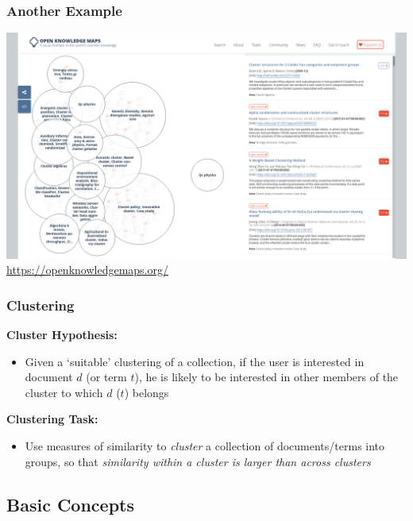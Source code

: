 \documentclass{beamer}
\begin{document}
\begin{frame}
  \frametitle{Another Example}

  \centering
  \includegraphics[width=\linewidth]{OKM}\\
  \footnotesize\url{https://openknowledgemaps.org/}

\end{frame}


\begin{frame}
  \frametitle{Clustering}

  \textbf{Cluster Hypothesis:}
  \begin{itemize}
  \item Given a `suitable' clustering of a collection, if the user is
    interested in document $d$ (or term $t$), he is likely to be interested
    in other members of the cluster to which $d$ ($t$) belongs
  \end{itemize}

  \textbf{Clustering Task:}
  \begin{itemize}
  \item Use measures of similarity to \emph{cluster} a collection of
    documents/terms into groups, so that \emph{similarity within a cluster
      is larger than across clusters}
  \end{itemize}

\end{frame}


\subsection{Basic Concepts}
\end{document}
